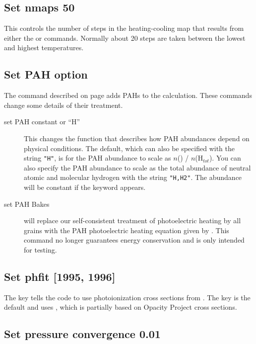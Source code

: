 \subsection{Set nmaps 50}

This controls the number of steps in the heating-cooling map that results
from either the  or  commands.  Normally about 20 steps are
taken between the lowest and highest temperatures.

\subsection{Set PAH option}
\label{sec:CommandSetPahOption}

The  command described on 
page \pageref{sec:GrainPAHcommands} adds PAHs to the calculation.
These  commands change some details of their treatment.

\begin{description}
\item[set PAH constant or ``H'']
This changes the function that describes how
PAH abundances depend on physical conditions.  The default, which can also
be specified with the string \verb|"H"|, is for the PAH abundance to
scale as $n$(\hO ) / $n$(H$_{tot}$).  You can also specify the PAH abundance
to scale as the total abundance of neutral atomic and molecular hydrogen
with the string \verb|"H,H2"|.
The abundance will be constant if the keyword
 appears.

\item[set PAH Bakes] will replace our self-consistent
treatment of photoelectric heating by all grains
with the PAH photoelectric heating equation given by \citet{Bakes1994}.
This command no longer guarantees energy conservation and is only intended for testing.
\end{description}

\subsection{Set phfit [1995, 1996]}

The key  tells the code to use photoionization
cross sections from \citet{Verner1995}.
The key  is the default and uses
\citet{VernerFerlandKorista1996}, which is partially based
on Opacity Project cross sections.

\subsection{Set pressure convergence 0.01}

